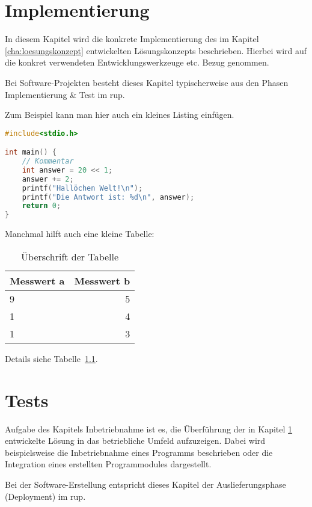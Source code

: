 \documentclass[oneside]{ausarbeitung}
\begin{document}
\chapter{Implementierung}
\label{cha:implementierung}

In diesem Kapitel wird die konkrete Implementierung des im Kapitel
\ref{cha:loesungskonzept} entwickelten Lösungskonzepts beschrieben.
Hierbei wird auf die konkret verwendeten Entwicklungswerkzeuge etc. 
Bezug genommen.

Bei Software-Projekten besteht dieses Kapitel typischerweise aus den 
Phasen Implementierung \& Test im \ac{rup}.

Zum Beispiel kann man hier auch ein kleines Listing einfügen.

\begin{lstlisting}[language=c,%
                   caption={Überschrift des Quelltexts}]
#include<stdio.h>

int main() {
    // Kommentar
    int answer = 20 << 1;
    answer += 2;
    printf("Hallöchen Welt!\n");
    printf("Die Antwort ist: %d\n", answer);
    return 0;
}
\end{lstlisting}

Manchmal hilft auch eine kleine Tabelle:

\begin{table}[htbp]
\centering
\begin{tabular}{|l|r|}
\hline
\textbf{Messwert a} & \textbf{Messwert b} \\ \hline
9 & 5 \\ \hline
1 & 4 \\ \hline
1 & 3 \\ \hline
\end{tabular}
\caption{Überschrift der Tabelle}
\label{tab:my-table}
\end{table}

Details siehe Tabelle~\ref{tab:my-table}.
\chapter{Tests}
\label{cha:tests}

Aufgabe des Kapitels Inbetriebnahme ist es, die Überführung der in 
Kapitel \ref{cha:implementierung} entwickelte Lösung in das betriebliche 
Umfeld aufzuzeigen. Dabei wird beispielsweise die Inbetriebnahme eines 
Programms beschrieben oder die Integration eines erstellten 
Programmodules dargestellt.

Bei der Software-Erstellung entspricht dieses Kapitel der 
Auslieferungsphase (Deployment) im \ac{rup}.
\end{document}
